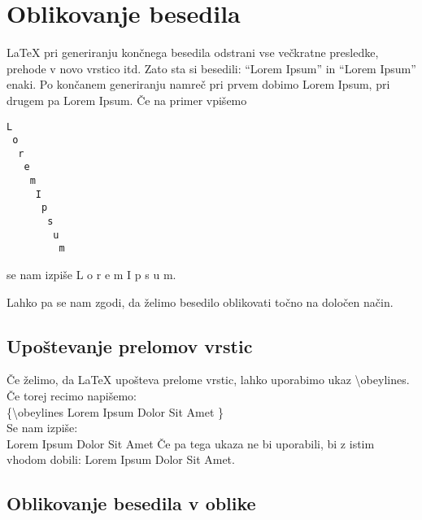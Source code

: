 \documentclass[a4paper]{book}
\newcommand\tbs{\textbackslash{}}
\begin{document}
\lipsum[1]


\section{Oblikovanje besedila}


\LaTeX{} pri generiranju končnega besedila odstrani vse večkratne presledke, prehode v novo vrstico itd. Zato sta si besedili: ``Lorem{ }{ }{ }{ }{ }{ }{ }{ }{ }{ }{ }{ }{ }{ }{ }{ }Ipsum'' in ``Lorem Ipsum'' enaki. Po končanem generiranju namreč pri prvem dobimo Lorem               Ipsum, pri drugem pa Lorem Ipsum. Če na primer vpišemo
\begin{verbatim}
L
 o
  r
   e
    m
     I
      p
       s
        u
         m
\end{verbatim}
se nam izpiše 
L
 o
  r
   e
    m
     I
      p
       s
        u
         m.

Lahko pa se nam zgodi, da želimo besedilo oblikovati točno na določen način. 

\subsection{Upoštevanje prelomov vrstic}

Če želimo, da \LaTeX{} upošteva prelome vrstic, lahko uporabimo ukaz \tbs{}obeylines.
Če torej recimo napišemo:
\\
{\obeylines\parindent=0pt
\{\tbs{}obeylines
Lorem Ipsum
Dolor Sit
Amet
\}\\
}
\noindent{} Se nam izpiše:
\\
{\obeylines\parindent=0pt
Lorem Ipsum
Dolor Sit
Amet
} Če pa tega ukaza ne bi uporabili, bi z istim vhodom dobili:
Lorem Ipsum
Dolor Sit
Amet.

\subsection{Oblikovanje besedila v oblike}
\end{document}
